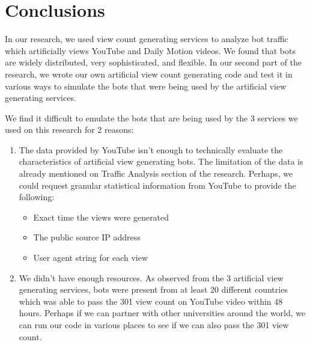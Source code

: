 \documentclass[conference]{IEEEtran}
\begin{document}
\section{Conclusions}

In our research, we used view count generating services to analyze bot traffic which artificially views YouTube and Daily Motion videos. We found that bots are widely distributed, very sophisticated, and flexible. In our second part of the research, we wrote our own artificial view count generating code and test it in various ways to simulate the bots that were being used by the artificial view generating services.

We find it difficult to emulate the bots that are being used by the 3 services we used on this research for 2 reasons:

\begin{enumerate}
  \item The data provided by YouTube isn’t enough to technically evaluate the characteristics of artificial view generating bots. The limitation of the data is already mentioned on Traffic Analysis section of the research. Perhaps, we could request granular statistical information from YouTube to provide the following:
  \begin{itemize}
    \item Exact time the views were generated
    \item The public source IP address
    \item User agent string for each view
  \end{itemize}
  \item We didn’t have enough resources. As observed from the 3 artificial view generating services, bots were present from at least 20 different countries which was able to pass the 301 view count on YouTube video within 48 hours. Perhaps if we can partner with other universities around the world, we can run our code in various places to see if we can also pass the 301 view count.
\end{enumerate}




\end{document}
